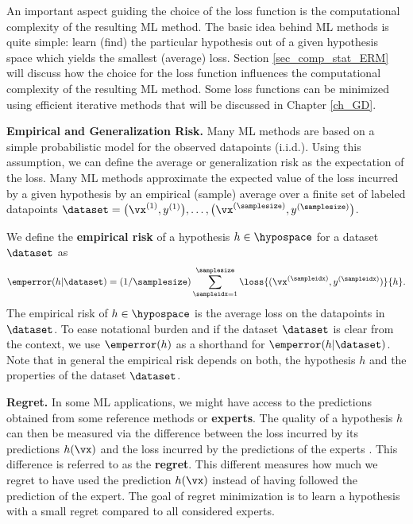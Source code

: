 \documentclass[12pt]{report}
\begin{document}
An important aspect guiding the choice of the loss function is the 
computational complexity of the resulting ML method. The basic 
idea behind ML methods is quite simple: learn (find) the particular 
hypothesis out of a given hypothesis space which yields the smallest 
(average) loss. Section \ref{sec_comp_stat_ERM} will discuss how  
the choice for the loss function influences the computational complexity 
of the resulting ML method. Some loss functions can be minimized using 
efficient iterative methods that will be discussed in Chapter \ref{ch_GD}. 


{\bf Empirical and Generalization Risk.} 
Many ML methods are based on a simple probabilistic model for the 
observed datapoints (i.i.d.). Using this assumption, we can define the 
average or generalization risk as the expectation of the loss. Many 
ML methods approximate the expected value of the loss incurred by 
a given hypothesis by an empirical (sample) average over a finite set 
of labeled datapoints $\dataset=\big(\vx^{(1)},y^{(1)}\big),\ldots,\big(\vx^{(\samplesize)},y^{(\samplesize)}\big)$. 

We define the {\bf empirical risk} of a hypothesis $h \in \hypospace$ for a dataset $\dataset$ as 
\begin{equation} 
\label{eq_def_emp_error_101}
\emperror(h|\dataset) = (1/\samplesize)\sum_{\sampleidx=1}^{\samplesize} \loss{(\vx^{(\sampleidx)},y^{(\sampleidx)})}{h}.  
\end{equation} 
The empirical risk of $h \in \hypospace$ is the average loss on the datapoints in $\dataset$. 
To ease notational burden and if the dataset $\dataset$ is clear from the context, 
we use $\emperror(h)$ as a shorthand for $\emperror(h|\dataset)$. Note that in general 
the empirical risk depends on both, the hypothesis $h$ and the properties of the dataset $\dataset$. 

{\bf Regret.} In some ML applications, we might have access to the 
predictions obtained from some reference methods or {\bf experts}. 
The quality of a hypothesis $h$ can then be measured via the 
difference between the loss incurred by its predictions 
$h(\vx)$ and the loss incurred by the predictions of the experts 
\cite{HazanOCO}. This difference is referred to as the {\bf regret}. 
This different measures how much we regret to have used the 
prediction $h(\vx)$ instead of having followed the prediction of the expert. 
The goal of regret minimization is to learn a hypothesis 
with a small regret compared to all considered experts. 
\end{document}
